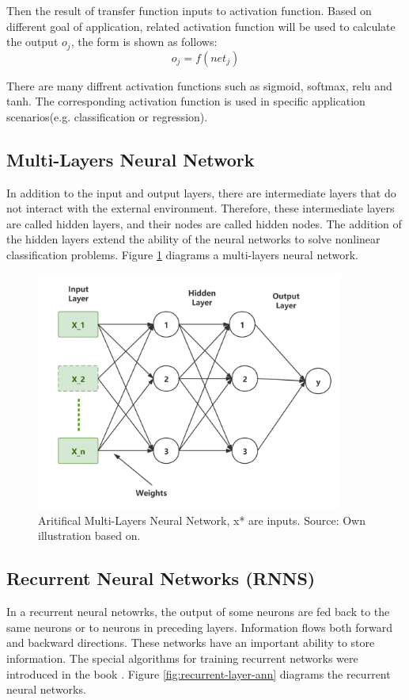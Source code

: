 Then the result of transfer function inputs to activation function. Based on different goal of application, related activation function will be used to calculate the output $o_j$, the form is shown as follows:
\begin{equation}
o_j = f(net_j)
\end{equation}

There are many diffrent activation functions such as sigmoid, softmax, relu and tanh. The corresponding activation function is used in specific application scenarios(e.g. classification or regression).

\subsection{Multi-Layers Neural Network}
In addition to the input and output layers, there are intermediate layers that do not interact with the external environment. Therefore, these intermediate layers are called hidden layers, and their nodes are called hidden nodes. The addition of the hidden layers extend the ability of the neural networks to solve nonlinear classification problems\parencite{BASHEER20003}. Figure \ref{fig:multi-layer-ann} diagrams a multi-layers neural network.

\begin{figure}[htbp]
\centering
\includegraphics[width=0.9\textwidth]{./images/multi-layer-ann.png}
\caption{Aritifical Multi-Layers Neural Network, x* are inputs. Source: Own illustration based
on\parencite{SAIRAMYA2019253}.}
\label{fig:multi-layer-ann}
\end{figure}

\subsection{Recurrent Neural Networks (RNNS)}
In a recurrent neural netowrks, the output of some neurons are fed back to the same neurons or to neurons in preceding layers\parencite{BASHEER20003}. Information flows both forward and backward directions. These networks have an important ability to store information. The special algorithms for training recurrent networks were introduced in the book \parencite{Hassoun1995}. Figure \ref{fig:recurrent-layer-ann} diagrams the recurrent neural networks.

